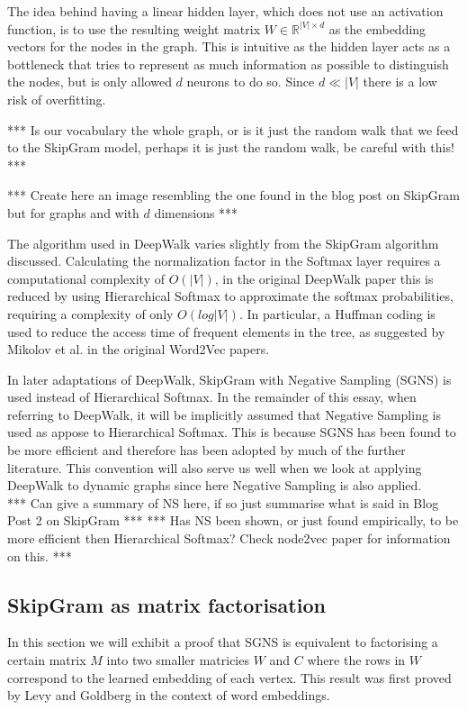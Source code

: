\documentclass[a4paper]{article}
\begin{document}
The idea behind having a linear hidden layer, which does not use an activation
function, is to use the resulting weight matrix $W \in \mathbb{R}^{|V| \times
  d}$ as the embedding vectors for the nodes in the graph. This is intuitive as
the hidden layer acts as a bottleneck that tries to represent as much
information as possible to distinguish the nodes, but is only allowed $d$
neurons to do so. Since $d \ll |V|$ there is a low risk of overfitting.

*** Is our vocabulary the whole graph, or is it just the random walk that we
feed to the SkipGram model, perhaps it is just the random walk, be careful with
this! ***

*** Create here an image resembling the one found in the blog post on SkipGram
but for graphs and with $d$ dimensions ***

The algorithm used in DeepWalk varies slightly from the SkipGram algorithm
discussed. Calculating the normalization factor in the Softmax layer requires a
computational complexity of $O(|V|)$, in the original DeepWalk paper this is
reduced by using Hierarchical Softmax to approximate the softmax probabilities,
requiring a complexity of only $O(log|V|)$. In particular, a Huffman coding is
used to reduce the access time of frequent elements in the tree, as suggested by
Mikolov et al. in the original Word2Vec
papers.\cite{mikolov2013distributed,mikolov2013efficient}

In later adaptations of DeepWalk, SkipGram with Negative Sampling (SGNS) is used instead of
Hierarchical Softmax. In the remainder of this essay, when referring to DeepWalk, it will be
implicitly assumed that Negative Sampling is used as appose to Hierarchical
Softmax. This is because SGNS has been found to be more efficient
and therefore has been adopted by much of the further literature. This convention will also
serve us well when we look at applying DeepWalk to dynamic graphs since here
Negative Sampling is also applied.\\

*** Can give a summary of NS here, if so just summarise what is said in Blog
Post 2 on SkipGram ***
*** Has NS been shown, or just found empirically, to be more efficient then
Hierarchical Softmax? Check node2vec paper for information on this. ***

\subsection{SkipGram as matrix factorisation}
In this section we will exhibit a proof that SGNS is
equivalent to factorising a certain matrix $M$ into two smaller matricies $W$
and $C$ where the rows in $W$ correspond to the learned embedding of each vertex. This result was first proved by Levy and
Goldberg\cite{levy&goldberg} in the context of word embeddings.\\
\end{document}
